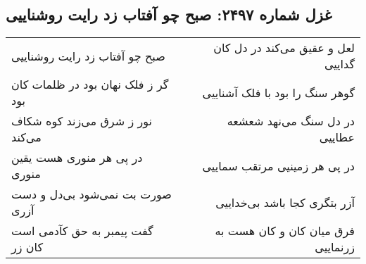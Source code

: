\begin{center}
\section*{غزل شماره ۲۴۹۷: صبح چو آفتاب زد رایت روشناییی}
\label{sec:2497}
\begin{longtable}{l p{0.5cm} r}
صبح چو آفتاب زد رایت روشناییی
&&
لعل و عقیق می‌کند در دل کان گداییی
\\
گر ز فلک نهان بود در ظلمات کان بود
&&
گوهر سنگ را بود با فلک آشناییی
\\
نور ز شرق می‌زند کوه شکاف می‌کند
&&
در دل سنگ می‌نهد شعشعه عطاییی
\\
در پی هر منوری هست یقین منوری
&&
در پی هر زمینیی مرتقب سماییی
\\
صورت بت نمی‌شود بی‌دل و دست آزری
&&
آزر بتگری کجا باشد بی‌خداییی
\\
گفت پیمبر به حق کآدمی است کان زر
&&
فرق میان کان و کان هست به زرنماییی
\\
\end{longtable}
\end{center}
